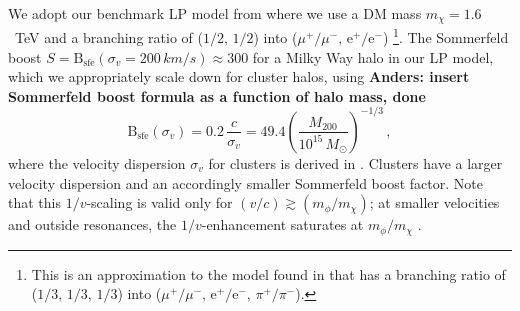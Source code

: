 \documentclass[10pt,aps,pra,reprint,amsmath,amsfonts,amssymb,showpacs,nofootinbib,floatfix]{revtex4-1}
\def\del#1{{}}
\newcommand{\rmn}{\mathrm}
\newcommand{\sfe}{\rmn{sfe}}
\newcommand{\msun}{M_\odot}
\newcommand{\B}{\rmn{B}}
\newcommand{\sigv}{\ensuremath{\sigma_v}}
\newcommand{\mvir}{M_{200}}
\newcommand{\e}{\rmn{e}}
\begin{document}
We adopt our benchmark LP model from \cite{Finkbeiner:2010sm} where we
use a DM mass $m_\chi=1.6$~TeV and a branching ratio of ($1/2,\,1/2$)
into ($\mu^+/\mu^-,\,\e^+/\e^-$) \footnote{This is an approximation to
  the model found in \cite{Finkbeiner:2010sm} that has a branching
  ratio of ($1/3,\,1/3,\,1/3$) into
  ($\mu^+/\mu^-,\,\e^+/\e^-,\,\pi^+/\pi^-$).}. The Sommerfeld boost
$S=\B_\sfe(\sigv=200\,km/s)\approx 300$ for a Milky Way halo in our LP
model, which we appropriately scale down for cluster halos, using
\del{To connect easily to our previous work
  \cite{2009PhRvL.103r1302P}, we choose as our benchmark LP model one
  with mass $1.6$~TeV and Sommerfeld boost
  $S=\B_\sfe(\sigv=200\,km/s)\approx 300$ for a Milky Way halo and
  scale this appropriately down for cluster halos, using} {\bf Anders:
  insert Sommerfeld boost formula as a function of halo mass, done}
\begin{equation}
\B_\sfe(\sigv) = 0.2\, \frac{c}{\sigv} = 
49.4 \left(\frac{\mvir}{10^{15}\,\msun}\right)^{-1/3}\,,
\label{eq:B_sfe}
\end{equation}
where the velocity dispersion $\sigv$ for clusters is derived in
\cite{2005RvMP...77..207V}. Clusters have a larger velocity dispersion
and an accordingly smaller Sommerfeld boost factor. Note that this
$1/v$-scaling is valid only for $(v/c) \gtrsim (m_\phi/m_\chi)$; at
smaller velocities and outside resonances, the $1/v$-enhancement
saturates at $m_\phi/m_\chi$ \cite{2008PhRvL.101z1301K}.
\end{document}

